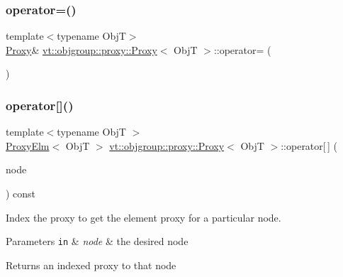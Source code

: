 \subsubsection{\texorpdfstring{operator=()}{operator=()}}
{\footnotesize\ttfamily template$<$typename ObjT$>$ \\
\hyperlink{structvt_1_1objgroup_1_1proxy_1_1_proxy}{Proxy}\& \hyperlink{structvt_1_1objgroup_1_1proxy_1_1_proxy}{vt\+::objgroup\+::proxy\+::\+Proxy}$<$ ObjT $>$\+::operator= (\begin{DoxyParamCaption}\item[{\hyperlink{structvt_1_1objgroup_1_1proxy_1_1_proxy}{Proxy}$<$ ObjT $>$ const \&}]{ }\end{DoxyParamCaption})\hspace{0.3cm}{\ttfamily [default]}}

\mbox{\label{structvt_1_1objgroup_1_1proxy_1_1_proxy_a00a267a8730fe2547776ff0136ea3895}} 
\subsubsection{\texorpdfstring{operator[]()}{operator[]()}}
{\footnotesize\ttfamily template$<$typename ObjT $>$ \\
\hyperlink{structvt_1_1objgroup_1_1proxy_1_1_proxy_elm}{Proxy\+Elm}$<$ ObjT $>$ \hyperlink{structvt_1_1objgroup_1_1proxy_1_1_proxy}{vt\+::objgroup\+::proxy\+::\+Proxy}$<$ ObjT $>$\+::operator\mbox{[}$\,$\mbox{]} (\begin{DoxyParamCaption}\item[{\hyperlink{namespacevt_a866da9d0efc19c0a1ce79e9e492f47e2}{Node\+Type}}]{node }\end{DoxyParamCaption}) const}



Index the proxy to get the element proxy for a particular node. 


\begin{DoxyParams}[1]{Parameters}
\mbox{\tt in}  & {\em node} & the desired node\\
\hline
\end{DoxyParams}
\begin{DoxyReturn}{Returns}
an indexed proxy to that node 
\end{DoxyReturn}
\mbox{\label{structvt_1_1objgroup_1_1proxy_1_1_proxy_a61273d407174fb496b4aed10ec6650bd}} 
